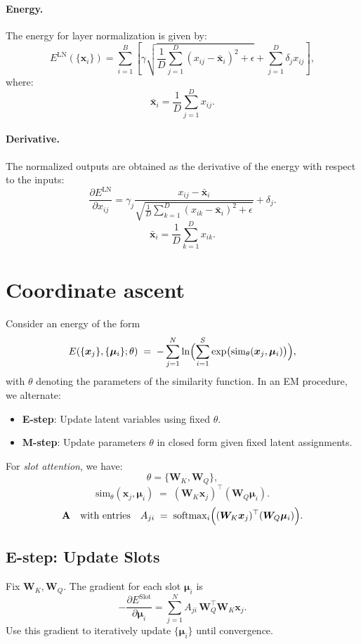 \documentclass{article}
\begin{document}
\paragraph{Energy.}
The energy for layer normalization is given by:
\[
E^{\mathrm{LN}}(\{\bm{x}_i\}) = \sum_{i=1}^B \left[ \gamma \sqrt{\frac{1}{D} \sum_{j=1}^D (x_{ij} - \bar{\bm{x}}_i)^2 + \epsilon} + \sum_{j=1}^D \delta_j x_{ij} \right],
\]
where:
\[
\bar{\bm{x}}_i = \frac{1}{D} \sum_{j=1}^D x_{ij}.
\]

\paragraph{Derivative.}
The normalized outputs are obtained as the derivative of the energy with respect to the inputs:
\[
\frac{\partial E^{\mathrm{LN}}}{\partial x_{ij}} = \gamma_j \frac{x_{ij} - \bar{\bm{x}}_i}{\sqrt{\frac{1}{D} \sum_{k=1}^D (x_{ik} - \bar{\bm{x}}_i)^2 + \epsilon}} + \delta_j.
\]
\[
\bar{\bm{x}}_i = \frac{1}{D} \sum_{k=1}^D x_{ik}.
\]


\section{Coordinate ascent}
\label{sec:generic-slot-attention-em}
    
    Consider an energy of the form
    \[
    E(\{\bm{x}_j\}, \{\bm{\mu}_i\}; \theta)
    \;=\;
    -\sum_{j=1}^N
    \ln\Bigl(\sum_{i=1}^S
    \exp\bigl(\mathrm{sim}_\theta(\bm{x}_j,\bm{\mu}_i)\bigr)\Bigr),
    \]
    with \(\theta\) denoting the parameters of the similarity function. In an EM procedure, we alternate:
    \begin{itemize}
        \item \textbf{E-step}: Update latent variables using fixed \(\theta\).
        \item \textbf{M-step}: Update parameters \(\theta\) in closed form given fixed latent assignments.
    \end{itemize}
    
    For \emph{slot attention}, we have:
    \[
    \theta = \{\bm{W}_K,\bm{W}_Q\},
    \] 
    \[
    \mathrm{sim}_\theta(\bm{x}_j,\bm{\mu}_i)
    \;=\;
    (\bm{W}_K\bm{x}_j)^\top(\bm{W}_Q\bm{\mu}_i).
    \]
    \[
    \mathbf{A} 
    \quad\text{with entries}\quad 
    A_{ji}
    \;=\;
    \mathrm{softmax}_i\Bigl(
    (\bm{W}_K\bm{x}_j)^\top(\bm{W}_Q\bm{\mu}_i)
    \Bigr).
    \]
    
    \subsection*{E-step: Update Slots}
    Fix \(\bm{W}_K,\bm{W}_Q\). The gradient for each slot \(\bm{\mu}_i\) is
    \[
    -\frac{\partial E^{\mathrm{Slot}}}{\partial \bm{\mu}_i}
    =
    \sum_{j=1}^N
    A_{ji}\,
    \bm{W}_Q^\top\bm{W}_K\bm{x}_j.
    \]
    Use this gradient to iteratively update \(\{\bm{\mu}_i\}\) until convergence.
    
\end{document}
